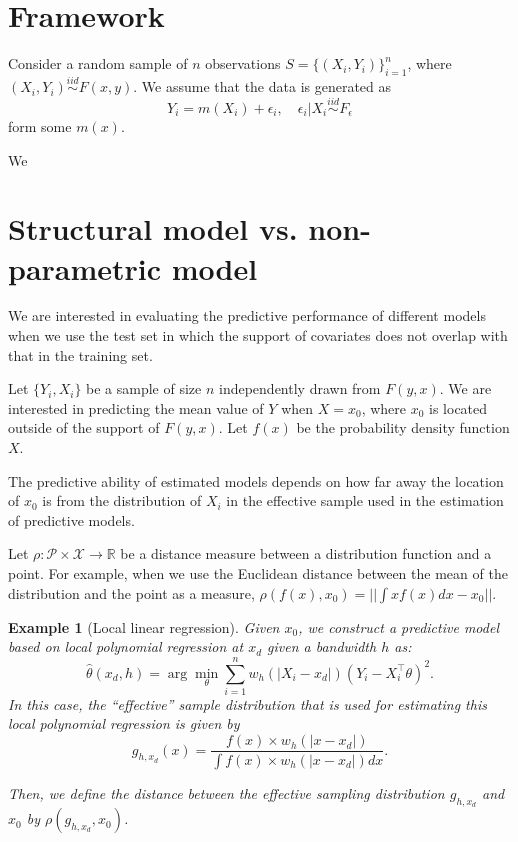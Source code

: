 \documentclass{article}
\newtheorem{example}{Example}
\begin{document}
\section{Framework}

Consider a random sample of $n$ observations $S=\{(X_i,Y_i)\}_{i=1}^n$, where $(X_i,Y_i)\overset{iid}{\sim} F(x,y)$. We assume that the data is generated as 
\[
Y_i = m(X_i) +\epsilon_i,\quad \epsilon_i|X_i \overset{iid}{\sim} F_\epsilon
\]
form some $m(x)$.

We 

\section{Structural model vs. non-parametric model}

We are interested in evaluating the predictive performance of different models when we use the test set in which the support of covariates does not overlap with that in the training set.  

Let $\{Y_i,X_i\}$ be a sample of size $n$ independently drawn from $F(y,x)$. We are interested in predicting the  mean value of $Y$ when $X=x_0$, where $x_0$ is located outside of the support of $F(y,x)$. Let $f(x)$ be the probability density function $X$.

The predictive ability of estimated models depends on how far away the location of $x_0$ is from the distribution of $X_i$ in the effective sample used in the estimation of predictive models.


 Let $\rho:\mathcal{P}\times  \mathcal{X}\rightarrow \mathbb{R}$ be a distance measure between a distribution function and a point. For example, when we use  the Euclidean distance between the mean of the distribution and the point as a measure, $\rho(f(x),x_0)=|| \int x f(x)dx-x_0||$.



\begin{example}[Local  linear regression]
Given $x_0$, we construct a predictive model based on local polynomial regression at $x_d$ given a bandwidth $h$ as:
\[
\hat\theta(x_d,h) = \arg\min_{\theta} \sum_{i=1}^n w_{h}(|X_i-x_d|) (Y_i-X_i^\top \theta)^2.
\]
  In this case, the ``effective'' sample distribution that is used for estimating this local polynomial regression is given by
\[
g_{h,x_d}(x) = \frac{f(x) \times w_{h}(|x-x_d|)}{\int f(x) \times w_{h}(|x-x_d|) dx}.
\]





Then, we define the distance between the effective sampling distribution $g_{h,x_d}$ and $x_0$ by $\rho(g_{h,x_d},x_0)$.
 
\end{example}
\end{document}
